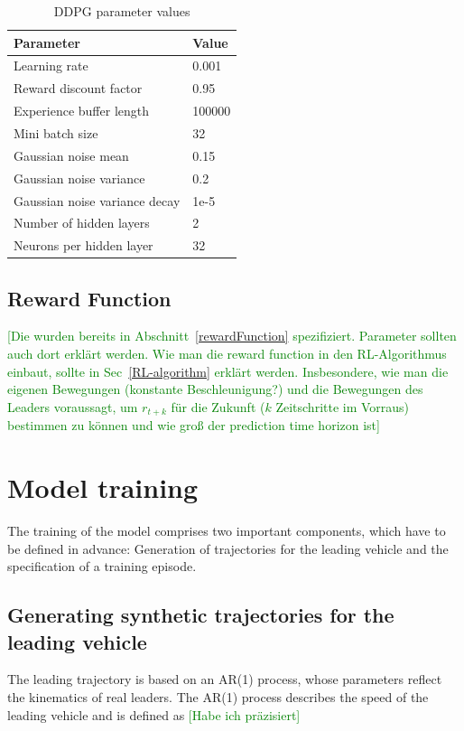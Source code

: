 \documentclass[review]{elsarticle}
\providecommand{\green}[1]{\textcolor{green}{#1}}
\providecommand{\martinc}[1]{\green{[#1]}} %
\providecommand{\3}{{\ss}}
\begin{document}
\begin{table}
	\caption{DDPG parameter values} 
	\label{tab:DDPGparameters} 
	\begin{center}
		\begin{tabular}{ p{} p{} }
			Parameter & Value \\ \hline
			Learning rate & 0.001 \\ 
			Reward discount factor & 0.95 \\ 
			Experience buffer length & 100000 \\ 
			Mini batch size & 32 \\ 			
			Gaussian noise mean & 0.15 \\ 
			Gaussian noise variance & 0.2 \\ 
			Gaussian noise variance decay  & 1e-5 \\ 
			Number of hidden layers & 2\\
			Neurons per hidden layer & 32\\
			

		\end{tabular}
	\end{center}
\end{table}


\subsection{Reward Function}
\martinc{Die wurden bereits in Abschnitt~\ref{rewardFunction}
  spezifiziert. Parameter sollten auch dort erkl\"art werden. Wie man
  die reward function in den RL-Algorithmus einbaut, sollte in
  Sec~\ref{RL-algorithm} erkl\"art werden. Insbesondere, wie man die
  eigenen Bewegungen (konstante Beschleunigung?) und die Bewegungen
  des Leaders voraussagt, um $r_{t+k}$ f\"ur die Zukunft ($k$
  Zeitschritte im
  Vorraus) bestimmen zu k\"onnen und wie gro\3 der prediction time
  horizon ist}



\section{Model training}
The training of the model comprises two important components, which
have to be defined in advance: Generation of trajectories for the
leading vehicle and
the specification of a training episode.

\subsection{Generating synthetic trajectories for the leading vehicle}
The leading trajectory is based on an AR(1) process, whose parameters
reflect the kinematics of real leaders. The AR(1) process describes
the speed of the leading vehicle and is defined as \martinc{Habe ich
  pr\"azisiert} 
\end{document}
